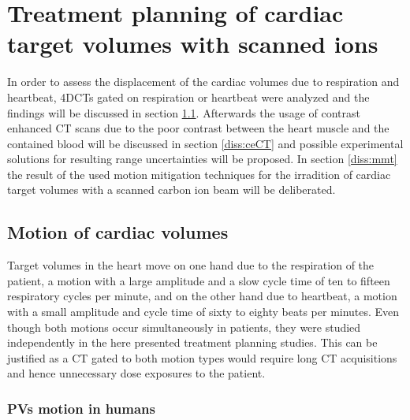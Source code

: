 \section{Treatment planning of cardiac target volumes with scanned ions}

In order to assess the displacement of the cardiac volumes due to respiration and heartbeat, 4DCTs gated on respiration or heartbeat 
were analyzed and the findings will be discussed in section \ref{diss:motion}. Afterwards the usage of contrast enhanced CT scans due to the 
poor contrast between the heart muscle and the contained blood will be discussed in section \ref{diss:ceCT} and possible experimental 
solutions for resulting range uncertainties will be proposed. In section \ref{diss:mmt} the result of the used motion mitigation techniques 
for the irradition of cardiac target volumes with a scanned carbon ion beam will be deliberated. 

\subsection{Motion of cardiac volumes}
\label{diss:motion}

Target volumes in the heart move on one hand due to the respiration of the patient, a motion with a large amplitude and a slow cycle time of 
ten to fifteen respiratory cycles per minute, and on the other hand due to heartbeat, a motion with a small amplitude and cycle time of sixty 
to eighty beats per minutes. Even though both motions occur simultaneously in patients, they were studied independently in the here presented 
treatment planning studies. This can be justified as a CT gated to both motion types would require long CT acquisitions and hence unnecessary 
dose exposures to the patient. 


\subsubsection{PVs motion in humans}

